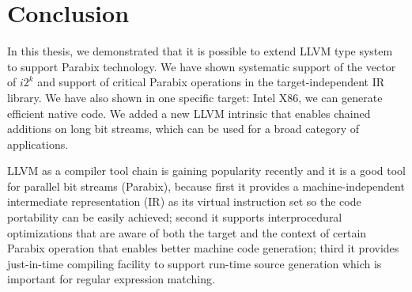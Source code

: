 %
%

\chapter{Conclusion}
\label{seven}

In this thesis, we demonstrated that it is possible to extend LLVM type system to support Parabix technology. We have shown systematic support of the vector of $i2^k$ and support of critical Parabix operations in the target-independent IR library. We have also shown in one specific target: Intel X86, we can generate efficient native code. We added a new LLVM intrinsic that enables chained additions on long bit streams, which can be used for a broad category of applications.

LLVM as a compiler tool chain is gaining popularity recently and it is a good tool for parallel bit streams (Parabix), because first it provides a machine-independent intermediate representation (IR) as its virtual instruction set so the code portability can be easily achieved; second it supports interprocedural optimizations that are aware of both the target and the context of certain Parabix operation that enables better machine code generation; third it provides just-in-time compiling facility to support run-time source generation which is important for regular expression matching.
